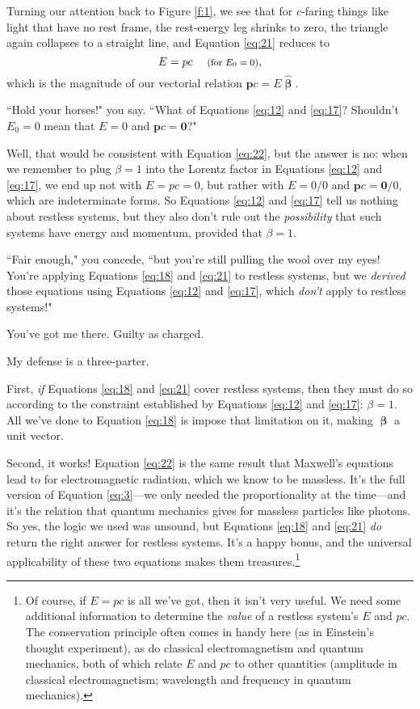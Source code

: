 \documentclass[12pt]{article}
\renewcommand{\vv}[1]{\mathbf{#1}}
\newcommand{\vvbeta}{\bm{\upbeta}}
\newcommand{\hatbeta}{\bm{\hat{\upbeta}}}
\begin{document}
Turning our attention back to Figure \ref{f:1}, we see that for $c$-faring things like light that have no rest frame, the rest-energy leg shrinks to zero, the triangle again collapses to a straight line, and Equation \ref{eq:21} reduces to
\begin{equation}\label{eq:22}
E=p c \quad \textrm{\footnotesize{ (for $E_0=0$)}},
\end{equation}
which is the magnitude of our vectorial relation $\vv p c = E \hatbeta$.

``Hold your horses!" you say. ``What of Equations \ref{eq:12} and \ref{eq:17}? Shouldn't $E_0 = 0$ mean that $E = 0$ and $\vv p c = \vv 0$?"

Well, that would be consistent with Equation \ref{eq:22}, but the answer is no: when we remember to plug $\beta = 1$ into the Lorentz factor in Equations \ref{eq:12} and \ref{eq:17}, we end up not with $E = p c = 0$, but rather with $E = 0/0$ and $\vv p c = \vv 0 / 0$, which are indeterminate forms. So Equations \ref{eq:12} and \ref{eq:17} tell us nothing about restless systems, but they also don't rule out the \emph{possibility} that such systems have energy and momentum, provided that $\beta = 1$.

``Fair enough," you concede, ``but you're still pulling the wool over my eyes! You're applying Equations \ref{eq:18} and \ref{eq:21} to restless systems, but we \emph{derived} those equations using Equations \ref{eq:12} and \ref{eq:17}, which \emph{don't} apply to restless systems!"

You've got me there. Guilty as charged.

My defense is a three-parter.

First, \emph{if} Equations \ref{eq:18} and \ref{eq:21} cover restless systems, then they must do so according to the constraint established by Equations \ref{eq:12} and \ref{eq:17}: $\beta = 1$. All we've done to Equation \ref{eq:18} is impose that limitation on it, making $\vvbeta$ a unit vector.

Second, it works! Equation \ref{eq:22} is the same result that Maxwell's equations lead to for electromagnetic radiation, which we know to be massless. It's the full version of Equation \ref{eq:3}---we only needed the proportionality at the time---and it's the relation that quantum mechanics gives for massless particles like photons. So yes, the logic we used was unsound, but Equations \ref{eq:18} and \ref{eq:21} \emph{do} return the right answer for restless systems. It's a happy bonus, and the universal applicability of these two equations makes them treasures.\footnote{Of course, if $E = p c$ is all we've got, then it isn't very useful. We need some additional information to determine the \emph{value} of a restless system's $E$ and $p c$. The conservation principle often comes in handy here (as in Einstein's thought experiment), as do classical electromagnetism and quantum mechanics, both of which relate $E$ and $p c$ to other quantities (amplitude in classical electromagnetism; wavelength and frequency in quantum mechanics).}
\end{document}
